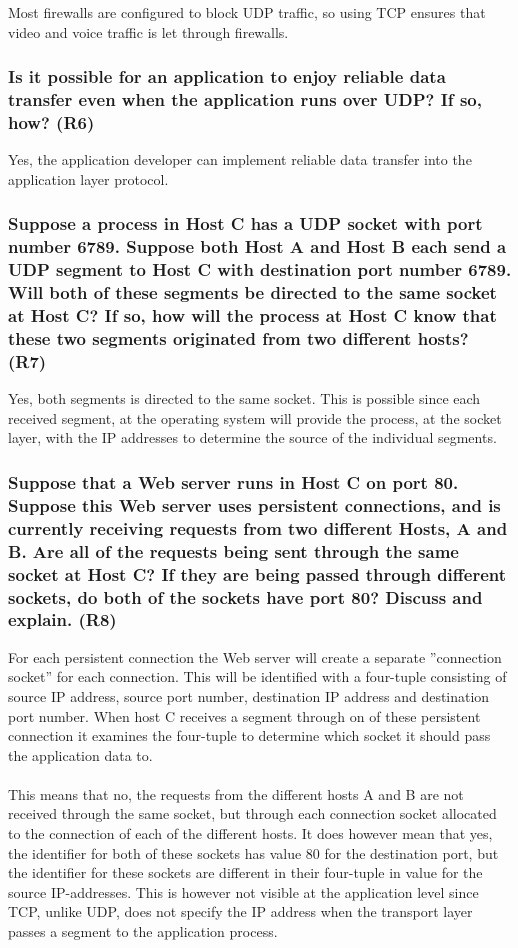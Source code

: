 Most firewalls are configured to block UDP traffic, so using TCP ensures that video and voice traffic is let through firewalls. 


\subsubsection{Is it possible for an application to enjoy reliable data transfer even when the application runs over UDP? If so, how? (R6)}

Yes, the application developer can implement reliable data transfer into the application layer protocol. 


\subsubsection{Suppose a process in Host C has a UDP socket with port number 6789. Suppose both Host A and Host B each send a UDP segment to Host C with destination port number 6789. Will both of these segments be directed to the same socket at Host C? If so, how will the process at Host C know that these two segments originated from two different hosts? (R7)}

Yes, both segments is directed to the same socket. This is possible since each received segment, at the operating system will provide the process, at the socket layer, with the IP addresses to determine the source of the individual segments.

\subsubsection{Suppose that a Web server runs in Host C on port 80. Suppose this Web server uses persistent connections, and is currently receiving requests from two different Hosts, A and B. Are all of the requests being sent through the same socket at Host C? If they are being passed through different sockets, do both of the sockets have port 80? Discuss and explain. (R8)}

For each persistent connection the Web server will create a separate ''connection socket'' for each connection. This will be identified with a four-tuple consisting of source IP address, source port number, destination IP address and destination port number. When host C receives a segment through on of these persistent connection it examines the four-tuple to determine which socket it should pass the application data to. \\
\\
This means that no, the requests from the different hosts A and B are not received through the same socket, but through each connection socket allocated to the connection of each of the different hosts. It does however mean that yes, the identifier for both of these sockets has value 80 for the destination port, but the identifier for these sockets are different in their four-tuple in value for the source IP-addresses. This is however not visible at the application level since TCP, unlike UDP, does not specify the IP address when the transport layer passes a segment to the application process.